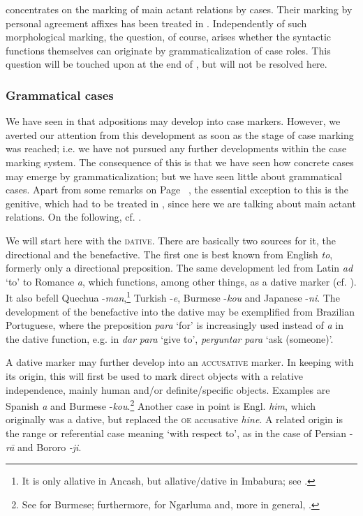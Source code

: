  concentrates on the marking of main actant relations by cases. Their marking by personal agreement affixes has been treated in . Independently of such morphological marking, the question, of course, arises whether the syntactic functions themselves can originate by grammaticalization of case roles. This question will be touched upon at the end of , but will not be resolved here.

\subsubsection{Grammatical cases} \label{sec:3.4.2.2}
We have seen in  that adpositions may develop into case markers. However, we averted our attention from this development as soon as the stage of case marking was reached; i.e. we have not pursued any further developments within the case marking system. The consequence of this is that we have seen how concrete cases may emerge by grammaticalization; but we have seen little about grammatical cases. Apart from some remarks on Page~\pageref{page88}\chk%
 , the essential exception to this is the genitive, which had to be treated in , since here we are talking about main actant relations. On the following, cf. \citealt[218]{Givón1979a}.

We will start here with the \textsc{dative}. There are basically two sources for it, the directional and the benefactive. The first one is best known from English \textit{to}, formerly only a directional preposition. The same development led from Latin \textit{ad} ‘to’ to Romance \textit{a}, which functions, among other things, as a dative marker (cf. ). It also befell Quechua -\textit{man},\footnote{It is only allative in Ancash, but allative/dative in Imbabura; see \citealt[104]{Cole1982}.} Turkish -\textit{e}, Burmese -\textit{kou} and Japanese -\textit{ni}. The development of the benefactive into the dative may be exemplified from Brazilian Portuguese, where the preposition \textit{para} ‘for’ is increasingly used instead of \textit{a} in the dative function, e.g. in \textit{dar} \textit{para} ‘give to’, \textit{perguntar} \textit{para} ‘ask (someone)’.

A dative marker may further develop into an \textsc{accusative} marker. In keeping with its origin, this will first be used to mark direct objects with a relative independence, mainly human and/or definite/specific objects. Examples are Spanish \textit{a} and Burmese -\textit{kou}.\footnote{See \citet{Kölver1985} for Burmese; furthermore, \citet[99]{Dixon1979} for Ngarluma and, more in general, \citet[48f, 166]{MallinsonEtAl1981}.} Another case in point is Engl. \textit{him}, which originally was a dative, but replaced the \textsc{oe} accusative \textit{hine}. A related origin is the range or referential case meaning ‘with respect to’, as in the case of  Persian -\textit{r\=a} and Bororo \textit{{}-ji}.

